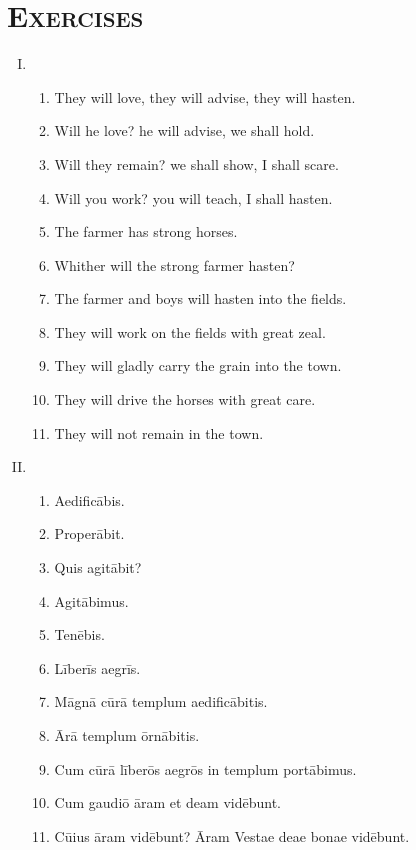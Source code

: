 \documentclass[12pt]{article}
\begin{document}
\section{\textsc{Exercises}}
\begin{enumerate}[I.]
	\setlength{\itemsep}{1em}
	\item \begin{enumerate}[1)]
		\item They will love, they will advise, they will hasten.
		\item Will he love? he will advise, we shall hold.
		\item Will they remain? we shall show, I shall scare.
		\item Will you work? you will teach, I shall hasten.
		\item The farmer has strong horses.
		\item Whither will the strong farmer hasten?
		\item The farmer and boys will hasten into the fields.
		\item They will work on the fields with great zeal.
		\item They will gladly carry the grain into the town.
		\item They will drive the horses with great care.
		\item They will not remain in the town.
	\end{enumerate}
	\item \begin{enumerate}[1)]
		\item Aedificābis.
		\item Properābit.
		\item Quis agitābit?
		\item Agitābimus.
		\item Tenēbis.
		\item Līberīs aegrīs.
		\item Māgnā cūrā templum aedificābitis.
		\item Ārā templum ōrnābitis.
		\item Cum cūrā līberōs aegrōs in templum portābimus.
		\item Cum gaudiō āram et deam vidēbunt.
		\item Cūius āram vidēbunt? Āram Vestae deae bonae vidēbunt.
	\end{enumerate}
\end{enumerate}
\end{document}
